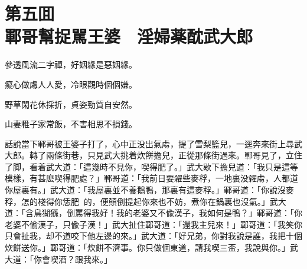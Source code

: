 
\chapter*{第五囬　\\鄆哥幫捉駡王婆　淫婦薬酖武大郎}


\begin{myquote}
參透風流二字禪，好姻緣是惡姻緣。

癡心做䖏人人愛，冷眼觀時個個嫌。

野草閑花休採折，貞姿勁質自安然。

山妻稚子家常飯，不害相思不損錢。
\end{myquote}

話說當下鄆哥被王婆子打了，心中正没出氣䖏，提了雪梨籃兒，一逕奔來街上尋武大郎。轉了兩條街巷，只見武大挑着炊餅擔兒，正從那條街過來。鄆哥見了，立住了脚，看着武大道：「這幾時不見你，喫得肥了。」武大歇下擔兒道：「我只是這等模樣，有甚麽喫得肥處？」鄆哥道：「我前日要糴些麥稃，一地裏没糴䖏，人都道你屋裏有。」武大道：「我屋裏並不養鵝鴨，那裏有這麥稃。」鄆哥道：「你說沒麥稃，怎的棧得你恁肥𦞂𦞂的，便顛倒提起你來也不妨，煮你在鍋裏也沒氣。」武大道：「含鳥猢猻，倒罵得我好！我的老婆又不偸漢子，我如何是鴨？」鄆哥道：「你老婆不偷漢子，只偸子漢！」武大扯住鄆哥道：「還我主兒來！」鄆哥道：「我笑你只會扯我，却不道咬下他左邊的來。」武大道：「好兄弟，你對我說是誰，我把十個炊餅送你。」鄆哥道：「炊餅不濟事。你只做個東道，請我喫三盃，我說與你。」武大道：「你會喫酒？跟我來。」

